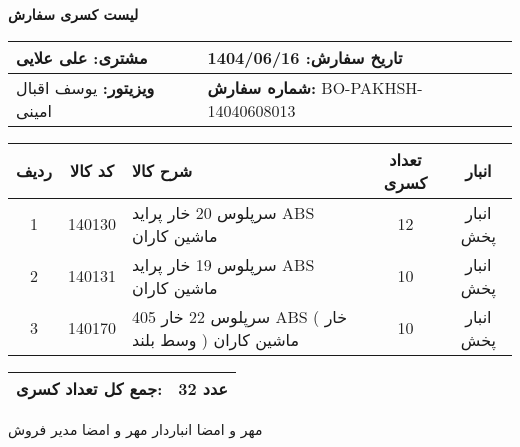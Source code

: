 \documentclass[a4paper,12pt]{article}
\begin{document}
\begin{center}
    {\Huge \textbf{   لیست کسری سفارش   }} \\
\end{center}

\vspace{0.5cm}

\noindent
\begin{tabular}{|p{7cm}|p{7cm}|}
\hline
\textbf{مشتری:} علی علایی & \textbf{تاریخ سفارش:} 1404/06/16 \\
\hline
\textbf{ویزیتور:} یوسف اقبال امینی & \textbf{شماره سفارش:} BO-PAKHSH-14040608013 \\
\hline
\end{tabular}

\vspace{0.5cm}

\begin{longtable}{|c|c|p{6cm}|c|c|}
\hline
\rowcolor{headerblue} \color{white}
\textbf{ردیف} &  \textbf{کد کالا} & \textbf{شرح کالا} & \textbf{تعداد کسری} & \textbf{انبار} \\
\hline
\endhead
1 & 140130 & سرپلوس 20 خار پرايد ABS ماشين کاران & 12 & انبار پخش \\
\hline
2 & 140131 & سرپلوس 19 خار پرايد ABS ماشين کاران & 10 & انبار پخش \\
\hline
3 & 140170 & سرپلوس 22 خار 405 ABS ( خار وسط بلند ) ماشين کاران & 10 & انبار پخش \\
\hline

\end{longtable}

\vspace{0.3cm}
\noindent
\begin{tabular}{|p{7cm}|p{7cm}|}
\hline
\textbf{جمع کل تعداد کسری:} & 32 عدد \\
\hline
\end{tabular}

\vspace{1.5cm}

\noindent
مهر و امضا انباردار \hspace{8cm} مهر و امضا مدیر فروش
\end{document}
